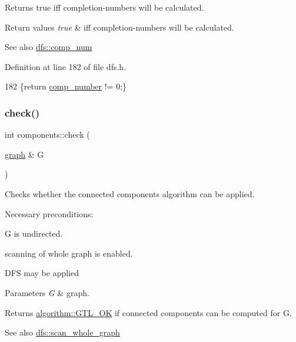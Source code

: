 Returns true iff completion-\/numbers will be calculated. 


\begin{DoxyRetVals}{Return values}
{\em true} & iff completion-\/numbers will be calculated. \\
\hline
\end{DoxyRetVals}
\begin{DoxySeeAlso}{See also}
\mbox{\hyperlink{classdfs_aceb066c806cb0beb5688b167a17387c7}{dfs\+::comp\+\_\+num}} 
\end{DoxySeeAlso}


Definition at line 182 of file dfs.\+h.


\begin{DoxyCode}
182 \{\textcolor{keywordflow}{return} \mbox{\hyperlink{classdfs_a00db016ac7eab69045cae408008890c1}{comp\_number}} != 0;\}
\end{DoxyCode}
\mbox{\label{classcomponents_aeeda901d02c65d6c31c8b6148540d7c1}} 
\subsubsection{\texorpdfstring{check()}{check()}}
{\footnotesize\ttfamily int components\+::check (\begin{DoxyParamCaption}\item[{\mbox{\hyperlink{classgraph}{graph}} \&}]{G }\end{DoxyParamCaption})\hspace{0.3cm}{\ttfamily [virtual]}}



Checks whether the connected components algorithm can be applied. 

Necessary preconditions\+:
\begin{DoxyItemize}
\item G is undirected.
\item scanning of whole graph is enabled.
\item D\+FS may be applied
\end{DoxyItemize}


\begin{DoxyParams}{Parameters}
{\em G} & graph. \\
\hline
\end{DoxyParams}
\begin{DoxyReturn}{Returns}
\mbox{\hyperlink{classalgorithm_af1a0078e153aa99c24f9bdf0d97f6710a5114c20e4a96a76b5de9f28bf15e282b}{algorithm\+::\+G\+T\+L\+\_\+\+OK}} if connected components can be computed for G. 
\end{DoxyReturn}
\begin{DoxySeeAlso}{See also}
\mbox{\hyperlink{classdfs_aa7c864a6f3a120720138b187b3ed95b5}{dfs\+::scan\+\_\+whole\+\_\+graph}} 
\end{DoxySeeAlso}


